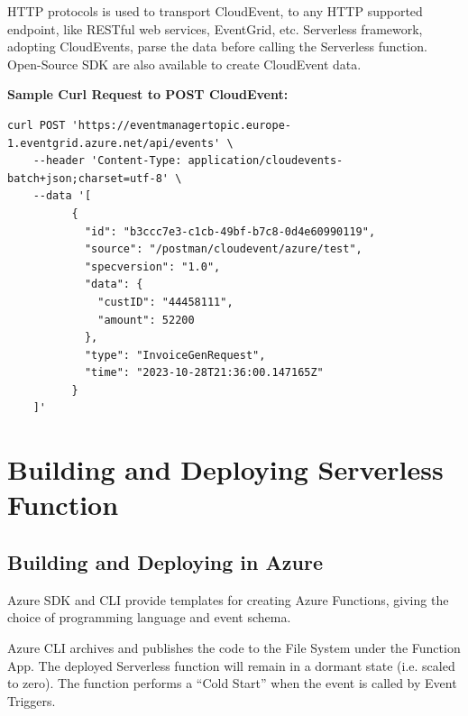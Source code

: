 \documentclass{article}
\begin{document}
\begin{flushleft}
\par
HTTP protocols is used to transport CloudEvent, to any HTTP supported endpoint, like RESTful web services, EventGrid, etc. Serverless framework, adopting CloudEvents,  parse the data before calling the Serverless function. Open-Source SDK are also available to create CloudEvent data.
\pagebreak
\par
\textbf{Sample Curl Request to POST CloudEvent:}
\begin{verbatim}
curl POST 'https://eventmanagertopic.europe-1.eventgrid.azure.net/api/events' \
    --header 'Content-Type: application/cloudevents-batch+json;charset=utf-8' \
    --data '[
          {
            "id": "b3ccc7e3-c1cb-49bf-b7c8-0d4e60990119",
            "source": "/postman/cloudevent/azure/test",
            "specversion": "1.0",
            "data": {
              "custID": "44458111",
              "amount": 52200
            },
            "type": "InvoiceGenRequest",
            "time": "2023-10-28T21:36:00.147165Z"
          }
    ]'
\end{verbatim}
\end{flushleft}
\pagebreak
\section{Building and Deploying Serverless Function}

\subsection{Building and Deploying in Azure}
\begin{flushleft}
Azure SDK and CLI provide templates for creating Azure Functions, giving the choice of programming language and event schema.
\par
Azure CLI archives and publishes the code to the File System under the Function App. The deployed Serverless function will remain in a dormant state (i.e. scaled to zero). The function performs a “Cold Start” when the event is called by Event Triggers.
\end{flushleft}
\end{document}
